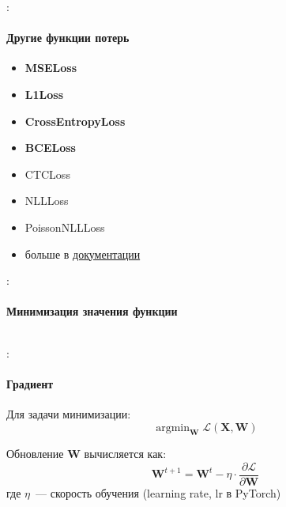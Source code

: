 \documentclass{beamer}
\def \TikzScale {0.7}
\DeclareMathOperator*{\argmin}{argmin}
\newcommand{\mtx}[1]{\boldsymbol{#1}}
\newcommand{\Loss}{\mathcal{L}}
\begin{document}
\begin{frame}{\secname : \subsecname}
  \framesubtitle{Другие функции потерь}
  \begin{itemize}
    \item \textbf{MSELoss}
    \item \textbf{L1Loss}
    \item \textbf{CrossEntropyLoss}
    \item \textbf{BCELoss}
    \item CTCLoss
    \item NLLLoss
    \item PoissonNLLLoss
    \item больше в
      \href{https://docs.pytorch.org/docs/stable/nn.html\#loss-functions}{документации}
  \end{itemize}
\end{frame}

\begin{frame}{\secname : \subsecname}
  \framesubtitle{Минимизация значения функции}

  \begin{columns}
    \begin{column}{0.5\textwidth}
    \end{column}

    \begin{column}{0.5\textwidth}
    \end{column}
  \end{columns}
\end{frame}

\begin{frame}{\secname : \subsecname}
  \framesubtitle{Градиент}
  Для задачи минимизации:
  $$
  \argmin_{\mtx{W}}\Loss\left(\mtx{X},\mtx{W}\right)
  $$

  Обновление $\mtx{W}$ вычисляется как:
  $$
  \mtx{W}^{t+1} = \mtx{W}^t - \eta \cdot \frac{\partial\Loss}{\partial\mtx{W}}
  $$
  где $\eta$~--- скорость обучения (learning rate, lr в PyTorch)
\end{frame}
\end{document}
